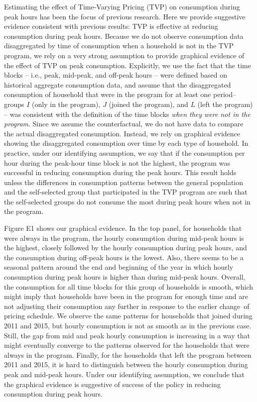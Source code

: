 Estimating the effect of Time-Varying Pricing (TVP) on consumption during peak hours has been the focus of previous research. Here we provide suggestive evidence consistent with previous results: TVP is effective at reducing consumption during peak hours. Because we do not observe consumption data disaggregated by time of consumption when a household is not in the TVP program, we rely on a very strong assumption to provide graphical evidence of the effect of TVP on peak consumption. Explicitly, we use the fact that the time blocks – i.e., peak, mid-peak, and off-peak hours – were defined based on historical aggregate consumption data, and assume that the disaggregated consumption of household that were in the program for at least one period– groups  \( I \)  (only in the program),  \( J \)  (joined the program), and  \( L \)  (left the program) – was consistent with the definition of the time blocks \textit{when they were not in the program}. Since we assume the counterfactual, we do not have data to compare the actual disaggregated consumption. Instead, we rely on graphical evidence showing the disaggregated consumption over time by each type of household. In practice, under our identifying assumption, we say that if the consumption per hour during the peak-hour time block is not the highest, the program was successful in reducing consumption during the peak hours. This result holds unless the differences in consumption patterns between the general population and the self-selected group that participated in the TVP program are such that the self-selected groups do not consume the most during peak hours when not in the program.

Figure E1 shows our graphical evidence. In the top panel, for households that were always in the program, the hourly consumption during mid-peak hours is the highest, closely followed by the hourly consumption during peak hours, and the consumption during off-peak hours is the lowest. Also, there seems to be a seasonal pattern around the end and beginning of the year in which hourly consumption during peak hours is higher than during mid-peak hours. Overall, the consumption for all time blocks for this group of households is smooth, which might imply that households have been in the program for enough time and are not adjusting their consumption any further in response to the earlier change\ of pricing schedule. We observe the same patterns for households that joined during 2011 and 2015, but hourly consumption is not as smooth as in the previous case. Still, the gap from mid and peak hourly consumption is increasing in a way that might eventually converge to the patterns observed for the households that were always in the program. Finally, for the households that left the program between 2011 and 2015, it is hard to distinguish between the hourly consumption during peak and mid-peak hours.  Under our identifying assumption, we conclude that the graphical evidence is suggestive of success of the policy in reducing consumption during peak hours.

